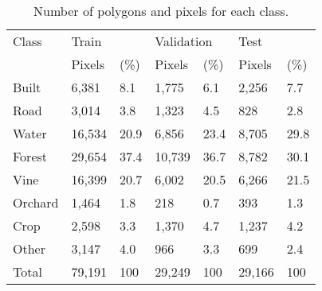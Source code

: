 \begin{table}[]
  \centering
  \begin{tabular}{lllllll}
  \hline
  Class   & \multicolumn{2}{l}{Train} & \multicolumn{2}{l}{Validation} & \multicolumn{2}{l}{Test} \\ \cline{2-7} 
          & Pixels  & (\%) & Pixels    & (\%)    & Pixels & (\%) \\ \hline
  Built   & 6,381   & 8.1             & 1,775     & 6.1                & 2,256  & 7.7             \\
  Road    & 3,014   & 3.8             & 1,323     & 4.5                & 828    & 2.8             \\
  Water   & 16,534  & 20.9            & 6,856     & 23.4               & 8,705  & 29.8            \\
  Forest  & 29,654  & 37.4            & 10,739    & 36.7               & 8,782  & 30.1            \\
  Vine    & 16,399  & 20.7            & 6,002     & 20.5               & 6,266  & 21.5            \\
  Orchard & 1,464   & 1.8             & 218       & 0.7                & 393    & 1.3             \\
  Crop    & 2,598   & 3.3             & 1,370     & 4.7                & 1,237  & 4.2             \\
  Other   & 3,147   & 4.0             & 966       & 3.3                & 699    & 2.4             \\ \hline
  Total   & 79,191  & 100             & 29,249    & 100                & 29,166 & 100            
  \end{tabular}
  \caption{Number of polygons and pixels for each class.}
\end{table}

